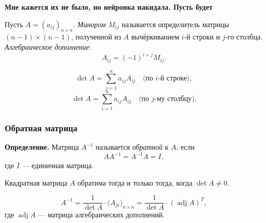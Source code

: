 \documentclass[12pt, a4paper]{article}
\begin{document}
\textbf{Мне кажется их не было, но нейронка накидала. Пусть будет}
\begin{tcolorbox}[title=Минор и алгебраическое дополнение]
Пусть $A = (a_{ij})_{n\times n}$.  
\textit{Минором} $M_{ij}$ называется определитель матрицы $(n-1)\times(n-1)$, полученной из $A$ вычёркиванием $i$-й строки и $j$-го столбца.  
\textit{Алгебраическое дополнение}:
\[
A_{ij} = (-1)^{i+j} M_{ij}.
\]
\end{tcolorbox}

\begin{tcolorbox}[title=Разложение определителя по строке (столбцу)]
\[
\det A = \sum_{j=1}^{n} a_{ij} A_{ij} \quad\text{(по $i$-й строке)},
\]
\[
\det A = \sum_{i=1}^{n} a_{ij} A_{ij} \quad\text{(по $j$-му столбцу)}.
\]
\end{tcolorbox}

\subsubsection{Обратная матрица}
\begin{tcolorbox}
\textbf{Определение.} Матрица $A^{-1}$ называется \textit{обратной} к $A$, если
\[
AA^{-1} = A^{-1}A = I,
\]
где $I$ — единичная матрица.
\end{tcolorbox}

\begin{tcolorbox}[title=Условие существования обратной матрицы]
Квадратная матрица $A$ обратима тогда и только тогда, когда $\det A \ne 0$.
\end{tcolorbox}

\begin{tcolorbox}[title=Формула обратной матрицы]
\[
A^{-1} = \frac{1}{\det A} \cdot \bigl( A_{ji} \bigr)_{n\times n} = \frac{1}{\det A} \cdot (\operatorname{adj} A)^T,
\]
где $\operatorname{adj} A$ — матрица алгебраических дополнений.
\end{tcolorbox}
\end{document}
